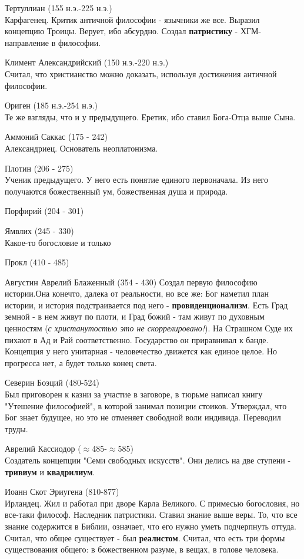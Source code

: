 Тертуллиан (155 н.э.-225 н.э.)\\
Карфагенец. Критик античной философии - язычники же все. Выразил концепцию Троицы. Верует, ибо абсурдно. Создал \textbf{патристику} - ХГМ-направление в философии.

Климент Александрийский (150 н.э.-220 н.э.)\\
Считал, что христианство можно доказать, используя достижения античной философии.

Ориген (185 н.э.-254 н.э.)\\
Те же взгляды, что и у предыдущего. Еретик, ибо ставил Бога-Отца выше Сына.

Аммоний Саккас (175 - 242)\\
Александриец. Основатель неоплатонизма.

Плотин (206 - 275)\\
Ученик предыдущего. У него есть понятие единого первоначала. Из него получаются божественный ум, божественная душа и природа.

Порфирий (204 - 301)

Ямвлих (245 - 330)\\
Какое-то богословие и только

Прокл (410 - 485)

Августин Аврелий Блаженный (354 - 430)
Создал первую философию истории.Она конечто, далека от реальности, но все же: Бог наметил план истории, и история подстраивается под него - \textbf{провиденционализм}. Есть Град земной - в нем живут по плоти, и Град божий - там живут по духовным ценностям (\textit{с христанутостью это не скоррелировано!}). На Страшном Суде их пихают в Ад и Рай соответственно. Государство он приравнивал к банде. Концепция у него унитарная - человечество движется как единое целое. Но прогресса нет, а будет только конец света.

Северин Боэций (480-524)\\
Был приговорен к казни за участие в заговоре, в тюрьме написал книгу "Утешение философией", в которой занимал позиции стоиков. Утверждал, что Бог знает будущее, но это не отменяет свободной воли индивида. Переводил труды.

Аврелий Кассиодор ($\approx$485-$\approx$585)\\
Создатель концепции "Семи свободных искусств". Они делись на две ступени - \textbf{тривиум} и \textbf{квадрилиум}.

Иоанн Скот Эриугена (810-877)\\
Ирландец. Жил и работал при дворе Карла Великого. С примесью  богословия, но все-таки философ. Наследник патристики. Ставил знание выше веры. То, что все знание содержится в Библии, означает, что его нужно уметь подчерпнуть оттуда. Считал, что общее существует - был \textbf{реалистом}. Считал, что есть три формы существования общего: в божественном разуме, в вещах, в голове человека.

